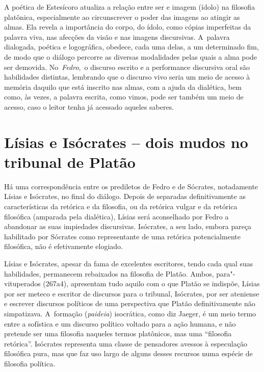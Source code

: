 A poética de Estesícoro atualiza a relação entre ser e imagem (ídolo) na
filosofia platônica, especialmente ao circunscrever o poder das imagens
ao atingir as almas. Ela revela a importância do corpo, do ídolo, como
cópias imperfeitas da palavra viva, nas afecções da visão e nas imagens
discursivas. A~palavra dialogada, poética e logográfica, obedece, cada
uma delas, a um determinado fim, de modo que o diálogo percorre as
diversas modalidades pelas quais a alma pode ser demovida.
No~\emph{Fedro},~o discurso escrito e a performance discursiva oral são
habilidades distintas, lembrando que o discurso vivo seria um meio de
acesso à memória daquilo que está inscrito nas almas, com a ajuda da
dialética, bem como, às vezes, a palavra escrita, como vimos, pode ser
também um meio de acesso, caso o leitor tenha já acessado aqueles
saberes.

 

\section{Lísias e Isócrates -- dois mudos no tribunal de Platão}

 

Há uma correspondência entre os prediletos de Fedro e de Sócrates,
notadamente Lísias e Isócrates, no final do diálogo. Depois de separadas
definitivamente as características da retórica e da filosofia, ou da
retórica vulgar e da retórica filosófica (amparada pela dialética),
Lísias será aconselhado por Fedro a abandonar as suas impiedades
discursivas. Isócrates, a seu lado, embora pareça habilitado por
Sócrates como representante de uma retórica potencialmente filosófica,
não é efetivamente elogiado.

Lísias e Isócrates, apesar da fama de excelentes escritores, tendo cada
qual suas habilidades, permanecem rebaixados na filosofia de Platão.
Ambos, para"-vituperados (267a4), apresentam tudo aquilo com o que Platão
se indispõe, Lísias por ser meteco e escritor de discursos para o
tribunal, Isócrates, por ser ateniense e escrever discursos políticos de
uma perspectiva que Platão definitivamente não simpatizava. A~formação
(\emph{paideia}) isocrática, como diz Jaeger, é um meio termo entre a
sofística e um discurso político voltado para a ação humana, e não
pretende ser uma filosofia naqueles termos platônicos, mas uma
``filosofia retórica''. Isócrates representa uma classe de pensadores
avessos à especulação filosófica pura, mas que faz uso largo de alguns
desses recursos numa espécie de filosofia política.

